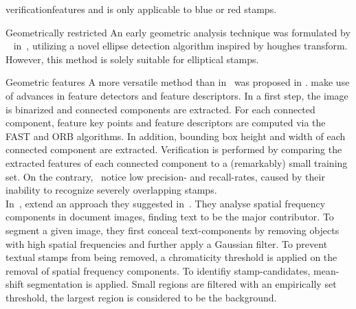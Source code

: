 \begin{description}
\begin{enumerate*}[label={\alph*)},font={\color{red!50!black}\bfseries}]
                    verificationfeatures and is only applicable to blue or red
                    stamps.\\
                \item [Geometrically restricted]
                    An early geometric analysis technique was formulated by
                    ~\citeauthor*{Zhu.2006} in~\cite{Zhu.2006}, utilizing a
                    novel ellipse detection algorithm inspired by houghes
                    transform. However, this method is solely suitable for
                    elliptical stamps.
        \end{enumerate*}
    \item [Generic approaches]
    \begin{enumerate*}[label={\alph*)},font={\color{red!50!black}\bfseries}]
        \item [Geometric features]
        A more versatile method than in~\cite{Zhu.2006} was proposed in
        \cite{Ahmed.25.08.201328.08.2013, Ahmed.2016}.
        \citeauthor*{Ahmed.25.08.201328.08.2013} make use of advances in
        feature detectors and feature descriptors. In a first step, the
        image is binarized and connected components are extracted. For each
        connected component, feature key points and feature descriptors are
        computed via the FAST and ORB algorithms. In addition, bounding box
        height and width of each connected component are extracted.
        Verification is performed by comparing the extracted features of each
        connected component to a (remarkably) small training set. On the
        contrary,~\citeauthor*{Ahmed.25.08.201328.08.2013} notice low precision-
        and recall-rates, caused by their inability to recognize severely
        overlapping stamps.\\
        In~\cite{Nandedkar.16.12.201519.12.2015},
        \citeauthor*{Nandedkar.16.12.201519.12.2015} extend an approach they
        suggested in~\cite{Nandedkar.23.08.201526.08.2015}. They analyse spatial
        frequency components in document images, finding text to be the major
        contributor. To segment a given image, they first conceal
        text-components by removing objects with high spatial frequencies and
        further apply a Gaussian filter. To prevent textual stamps from being
        removed, a chromaticity threshold is applied on the removal of spatial
        frequency components. To identifiy stamp-candidates, mean-shift
        segmentation is applied. Small regions are filtered with an empirically
        set threshold, the largest region is considered to be the background.

\end{enumerate*}
\end{description}
